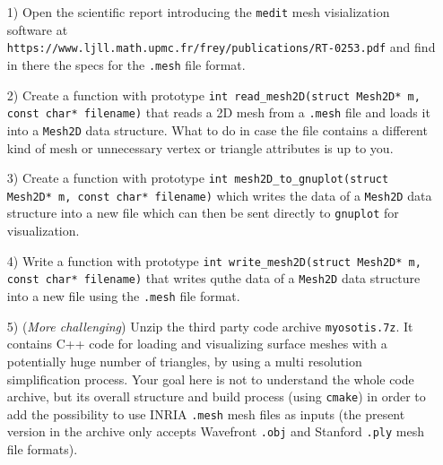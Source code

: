 \documentclass[a4paper,12pt]{article}
\begin{document}
\begin{itemize}
\item[1)]  Open the scientific report introducing the {\tt medit} mesh visialization software at\\ 
{\tt https://www.ljll.math.upmc.fr/frey/publications/RT-0253.pdf} and find in there the specs for the {\tt .mesh} file format.\\[-5pt]

\item[2)] Create a function with prototype \texttt{int read\_mesh2D(struct Mesh2D* m, const char* filename)}
  that reads a 2D mesh from a {\tt .mesh} file and loads it into a {\tt Mesh2D} data structure. What to do in case the file contains a different kind of mesh or unnecessary vertex or triangle attributes is up to you.\\[-5pt]

\item[3)] Create a function with prototype \texttt{int mesh2D\_to\_gnuplot(struct Mesh2D* m, const char* filename)} which writes the data of a {\tt Mesh2D} data structure into a new file which can then be sent directly to {\tt gnuplot} for visualization.\\[-5pt]
  
\item[4)] Write a function with prototype \texttt{int write\_mesh2D(struct Mesh2D* m, const char* filename)} that writes quthe data of a {\tt Mesh2D} data structure into a new file using the {\tt .mesh} file format.   

\item[5)] ({\it More challenging}) Unzip the third party code archive {\tt myosotis.7z}. It contains C++ code for loading and visualizing surface meshes with a potentially huge number of triangles, by using a multi resolution simplification process. Your goal here is not to understand the whole code archive, but its overall structure and build process (using {\tt cmake}) in order to add the possibility to use INRIA {\tt .mesh} mesh files as inputs (the present version in the archive only accepts Wavefront {\tt .obj} and Stanford {\tt .ply} mesh file formats).  

\end{itemize}
\end{document}
